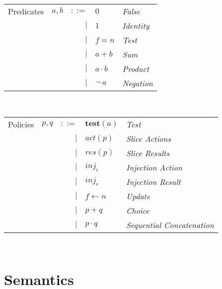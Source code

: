 \documentclass[12pt, letterpaper]{article}
\begin{document}
    \begin{tabular}{l c r l l}
      Predicates  & $a,b$     & $::=$  & $0$          & \textit{False} \\
                  &           & $\mid$ & $1$          & \textit{Identity}    \\
                  &           & $\mid$ & $f=n$        & \textit{Test} \\  
                  &           & $\mid$ & $a + b$      & \textit{Sum}      \\
                  &           & $\mid$ & $a \cdot b$  & \textit{Product}  \\
                  &           & $\mid$ & $\neg \ a$   & \textit{Negation}
    \end{tabular}\\

    \begin{tabular}{l c r l l}
      Policies  & $p,q$ & $::=$  & $\mathbf{test}(a)$ & \textit{Test}     \\
                &       & $\mid$ & $act(p)$           & \textit{Slice Actions}    \\
                &       & $\mid$ & $res(p)$           & \textit{Slice Results}    \\
                &       & $\mid$ & $inj_{i}$          & \textit{Injection Action} \\
                &       & $\mid$ & $inj_{r}$          & \textit{Injection Result} \\
                &       & $\mid$ & $f \leftarrow n$   & \textit{Update}   \\
                &       & $\mid$ & $p + q$            & \textit{Choice}   \\
                &       & $\mid$ & $p \cdot q$        & \textit{Sequential Concatenation} \\
    \end{tabular}\\

  \clearpage
  \section{Semantics}
\end{document}
